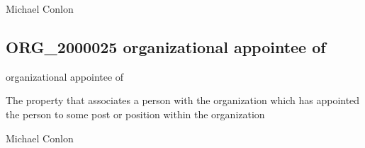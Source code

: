 \documentclass[letterpaper,10pt,english]{sphinxmanual}
\begin{document}
\begin{sphinxShadowBox}

\sphinxAtStartPar
Michael Conlon 
\end{sphinxShadowBox}
\begin{quote}

\ignorespaces \end{quote}


\subsection{ORG\_2000025 \sphinxhyphen{} organizational appointee of}
\label{\detokenize{doc-ORG_2000025:org-2000025-organizational-appointee-of}}\label{\detokenize{doc-ORG_2000025:index-0}}\label{\detokenize{doc-ORG_2000025::doc}}
\begin{sphinxShadowBox}

\sphinxAtStartPar
organizational appointee of
\end{sphinxShadowBox}

\begin{sphinxShadowBox}

\sphinxAtStartPar
{}
\end{sphinxShadowBox}

\begin{sphinxShadowBox}

\sphinxAtStartPar
The property that associates a person with the organization which has appointed the person to some post or position within the organization
\end{sphinxShadowBox}

\begin{sphinxShadowBox}

\sphinxAtStartPar
Michael Conlon 
\end{sphinxShadowBox}

\begin{sphinxShadowBox}

\sphinxAtStartPar
{\hyperref[\detokenize{doc-NCBITaxon_9606::doc}]{}}
\end{sphinxShadowBox}
\end{document}
